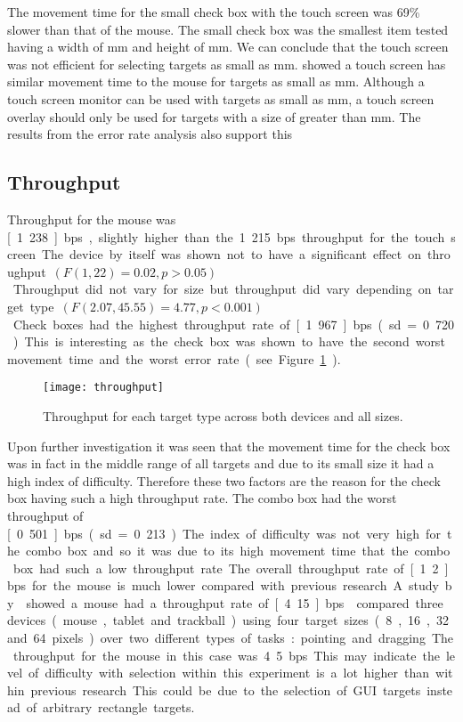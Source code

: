 \documentclass{elsart}
\begin{document}
The movement time for the small check box with the touch screen was 69\%
slower than that of the mouse. The small check box was the smallest item
tested having a width of \unit[4]{mm} and height of \unit[4]{mm}. We can
conclude that the touch screen was not efficient for selecting targets
as small as \unit[4]{mm}. \citet{Sear-A-1991-IJMMS} showed a touch
screen has similar movement time to the mouse for targets as small as
\unit[2]{mm}. Although a touch screen monitor can be used with targets
as small as \unit[2]{mm}, a touch screen overlay should only be used for
targets with a size of greater than \unit[4]{mm}. The results from the
error rate analysis also support this

\subsection{Throughput}
\label{sec-results-throughput}

Throughput for the mouse was \unit[1.238]{bps}, slightly higher than the
1.215 bps throughput for the touch screen. The device by itself was
shown not to have a significant effect on throughput \((F(1, 22) = 0.02,
p > 0.05)\). Throughput did not vary for size but throughput did vary
depending on target type \((F(2.07, 45.55) = 4.77, p < 0.001)\). Check
boxes had the highest throughput rate of \unit[1.967]{bps} (sd = 0.720).
This is interesting as the check box was shown to have the second worst
movement time and the worst error rate (see
Figure~\ref{fig-throughput}).

\begin{figure}
	\centering
	\texttt{[image: throughput]}
	\caption{Throughput for each target type across both devices and all
	sizes.}
	\label{fig-throughput}
\end{figure}

Upon further investigation it was seen that the movement time for the
check box was in fact in the middle range of all targets and due to its
small size it had a high index of difficulty. Therefore these two
factors are the reason for the check box having such a high throughput
rate. The combo box had the worst throughput of \unit[0.501]{bps} (sd =
0.213). The index of difficulty was not very high for the combo box and
so it was due to its high movement time that the combo box had such a
low throughput rate.

The overall throughput rate of \unit[1.2]{bps} for the mouse is much
lower compared with previous research. A study by
\citet{Doug-SA-1994-SIGCHI} showed a mouse had a throughput rate of
\unit[4.15]{bps}. \citet{Mack-IS-1991} compared three devices (mouse,
tablet and trackball) using four target sizes (8, 16, 32 and 64 pixels)
over two different types of tasks: pointing and dragging. The throughput
for the mouse in this case was 4.5 bps. This may indicate the level of
difficulty with selection within this experiment is a lot higher than
within previous research. This could be due to the selection of GUI
targets instead of arbitrary rectangle targets.
\end{document}
